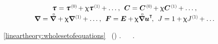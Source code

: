 \begin{minipage}{\linewidth}
\begin{itemize}
{{\nopagebreak\vspace{-0.1em}\begin{equation*}
\begin{array}{c}
\cauchystress \hspace{.1ex} = \cauchystress^{\hspace{.2ex}\scalebox{0.66}{(0)}} \hspace{-0.2ex} + \smallparameter \cauchystress^{\hspace{.2ex}\scalebox{0.66}{(1)}} \hspace{-0.1ex} + \ldots \hspace{.1ex},
\:\:
\bm{C} = \bm{C}^{\hspace{.2ex}\scalebox{0.66}{(0)}} \hspace{-0.2ex} + \smallparameter \bm{C}^{\hspace{.2ex}\scalebox{0.66}{(1)}} \hspace{-0.1ex} + \ldots \hspace{.1ex} ,
\\[.1em]
%
\boldnabla \hspace{.1ex} = \boldnablacircled \hspace{.1ex} + \smallparameter \boldnabla^{\hspace{.2ex}\scalebox{0.66}{(1)}} \hspace{-0.1ex} + \ldots \hspace{.1ex} , \:\:
\bm{F} = \UnitDyad + \hspace{-0.1ex} \smallparameter \boldnablacircled {\bm{u}}^{\T} \hspace{-0.3ex},
\:\:
J = 1 + \hspace{-0.1ex} \smallparameter J^{\hspace{.1ex}\scalebox{0.66}{(1)}} \hspace{-0.1ex} + \ldots
\end{array}
\end{equation*}

\vspace{-0.1em}\noindent
{}~\eqref{lineartheory:wholesetofequations}
~()
.
~\hbox{~\cite{truesdell-firstcourse}}
.

}}
\end{itemize}
\end{minipage}
